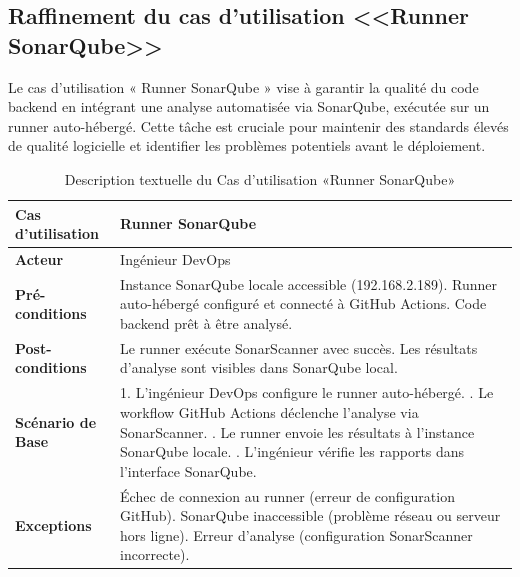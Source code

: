   \subsection{Raffinement du cas d'utilisation <<Runner SonarQube>>}
  Le cas d’utilisation « Runner SonarQube » vise à garantir la qualité du code backend en intégrant une analyse automatisée via SonarQube, exécutée sur un runner auto-hébergé. Cette tâche est cruciale pour maintenir des standards élevés de qualité logicielle et identifier les problèmes potentiels avant le déploiement.
  \newpage
  \begin{table}[!ht]
      \centering
      \caption{Description textuelle du Cas d’utilisation «Runner SonarQube»}
      \label{tab:runner_sonarqube}
      \renewcommand{\arraystretch}{1.2}
      \begin{tabular}{|p{4.2cm}|p{11cm}|}
      \hline
      \textbf{Cas d'utilisation} & Runner SonarQube \\
      \hline
      \textbf{Acteur} & Ingénieur DevOps \\
      \hline
      \textbf{Pré-conditions} & Instance SonarQube locale accessible (192.168.2.189). \newline Runner auto-hébergé configuré et connecté à GitHub Actions. \newline Code backend prêt à être analysé. \\
      \hline
      \textbf{Post-conditions} & Le runner exécute SonarScanner avec succès. \newline Les résultats d’analyse sont visibles dans SonarQube local. \\
      \hline
      \textbf{Scénario de Base} & 
      1. L’ingénieur DevOps configure le runner auto-hébergé. \newline
      2. Le workflow GitHub Actions déclenche l’analyse via SonarScanner. \newline
      3. Le runner envoie les résultats à l’instance SonarQube locale. \newline
      4. L’ingénieur vérifie les rapports dans l’interface SonarQube. \\
      \hline
      \textbf{Exceptions} & 
      Échec de connexion au runner (erreur de configuration GitHub). \newline SonarQube inaccessible (problème réseau ou serveur hors ligne). \newline Erreur d’analyse (configuration SonarScanner incorrecte). \\
      \hline
      \end{tabular}
  \end{table}
